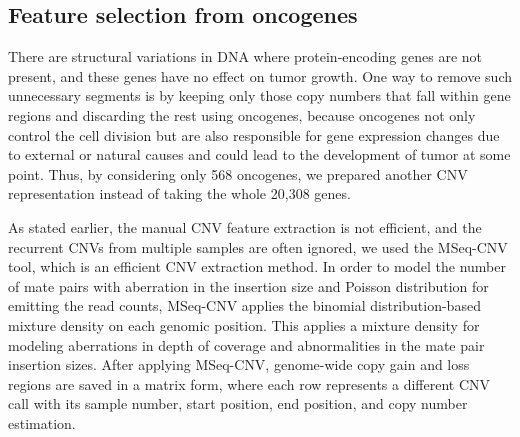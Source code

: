 \subsection{Feature selection from oncogenes}
There are structural variations in DNA where protein-encoding genes are not present, and these genes have no effect on tumor growth. One way to remove such unnecessary segments is by keeping only those copy numbers that fall within gene regions and discarding the rest using oncogenes, because oncogenes not only control the cell division but are also responsible for gene expression changes due to external or natural causes and could lead to the development of tumor at some point. Thus, by considering only 568 oncogenes, we prepared another CNV representation instead of taking the whole 20,308 genes. 

\hspace*{3.5mm} As stated earlier, the manual CNV feature extraction is not efficient, and the recurrent CNVs from multiple samples are often ignored, we used the MSeq-CNV tool, which is an efficient CNV extraction method. In order to model the number of mate pairs with aberration in the insertion size and Poisson distribution for emitting the read counts, MSeq-CNV applies the binomial distribution-based mixture density on each genomic position. This applies a mixture density for modeling aberrations in depth of coverage and abnormalities in the mate pair insertion sizes. After applying MSeq-CNV, genome-wide copy gain and loss regions are saved in a matrix form, where each row represents a different CNV call with its sample number, start position, end position, and copy number estimation.
 

